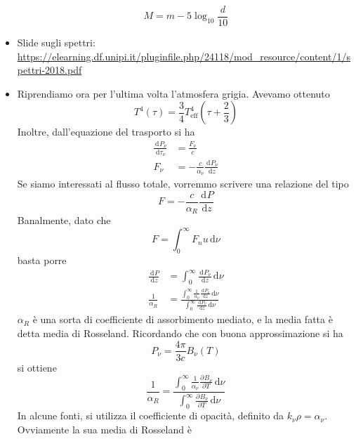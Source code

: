\documentclass[a4paper,11pt]{article}
\renewcommand{\d}{\mathrm{d}} %
\newcommand{\der}[3][]{\frac{\d ^{#1}#2}{\d {#3}^{#1}}} %
\newcommand{\pder}[3][]{\frac{\partial ^{#1}#2}{\partial {#3}^{#1}}} %
\renewcommand{\d}{\,\mathrm{d}}
\theoremstyle{theorem}
\theoremstyle{definition}
\begin{document}
\begin{itemize}
	\[M=m-5\log_{10}\frac{d}{10}\]
	\item Slide sugli spettri: \url{https://elearning.df.unipi.it/pluginfile.php/24118/mod_resource/content/1/spettri-2018.pdf}
	\item Riprendiamo ora per l'ultima volta l'atmosfera grigia. Avevamo ottenuto
	\[T^4(\tau)=\frac{3}{4}T_{\textrm{eff}}^4\left(\tau+\frac{2}{3}\right)\]
	Inoltre, dall'equazione del trasporto si ha
	\begin{align*}\der{P_\nu}{\tau_\nu}&=\frac{F_\nu}{c}\\F_\nu&=-\frac{c}{\alpha_\nu}\der{P_\nu}{z}\end{align*}
	Se siamo interessati al flusso totale, vorremmo scrivere una relazione del tipo
	\[F=-\frac{c}{\alpha_R}\der{P}{z}\]
	Banalmente, dato che
	\[F=\int_{0}^{\infty}F_nu\d\nu\]
	basta porre
	\begin{align*}
		\der{P}{z}&=\int_{0}^{\infty}\der{P_\nu}{z}\d\nu\\
		\frac{1}{\alpha_R}&=\frac{\int_{0}^{\infty}\frac{1}{\alpha_\nu}\der{P_\nu}{z}\d\nu}{\int_{0}^{\infty}\der{P_\nu}{z}\d\nu}
	\end{align*}
	$\alpha_R$ è una sorta di coefficiente di assorbimento mediato, e la media fatta è detta media di Rosseland. Ricordando che con buona approssimazione si ha
	\[P_\nu=\frac{4\pi}{3c}B_\nu(T)\]
	si ottiene
	\[\frac{1}{\alpha_R}=\frac{\int_{0}^{\infty}\frac{1}{\alpha_\nu}\pder{B_\nu}{T}\d\nu}{\int_{0}^{\infty}\pder{B_\nu}{T}\d\nu}\]
	In alcune fonti, si utilizza il coefficiente di opacità, definito da $k_\nu\rho=\alpha_\nu$. Ovviamente la sua media di Rosseland è
	

\end{itemize}
\end{document}
